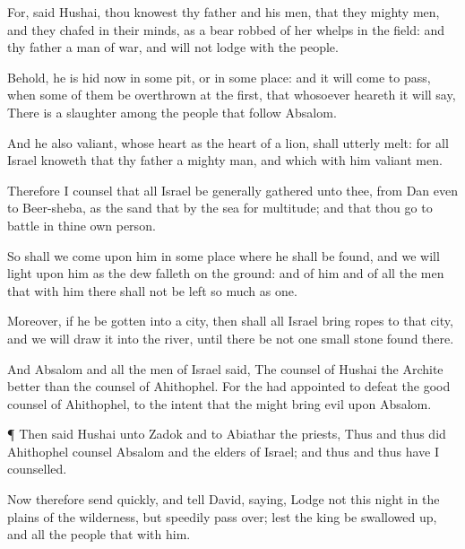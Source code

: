 {For,
said
Hushai, thou
knowest thy
father and his
men, that they
{} mighty
men, and they
{}
chafed in their
minds, as a
bear
robbed of her whelps in the
field: and thy
father
{} a
man of
war, and will not
lodge with the
people.

Behold, he is
hid now in
some
pit, or in
some
{}
place: and it will come to pass, when some of them be
overthrown at the
first, that
whosoever
heareth it will
say, There is a
slaughter among the
people that
follow
Absalom.

And he also
{}
valiant, whose
heart
{} as the
heart of a
lion, shall
utterly
melt: for all
Israel
knoweth that thy
father
{} a mighty
man, and
{} which
{} with him
{}
valiant
men.

Therefore I
counsel that all
Israel be
generally
gathered unto thee, from
Dan even to
Beer-sheba, as the
sand that
{} by the
sea for
multitude; and that thou
go to
battle in thine own
person.

So shall we
come upon him in
some
place where he shall be
found, and we will
light upon him as the
dew
falleth on the
ground: and of him and of all the
men that
{} with him there shall not be
left so much
as
one.

Moreover,
if he be
gotten into a
city, then shall all
Israel
bring
ropes to that
city, and we will
draw it into the
river, until there be not
one small
stone
found there.

And
Absalom and all the
men of
Israel
said, The
counsel of
Hushai the
Archite
{}
better than the
counsel of
Ahithophel. For the
{} had
appointed to
defeat the
good
counsel of
Ahithophel, to the
intent that the
{} might
bring
evil upon
Absalom.


\par }{\PP {}¶ Then
said
Hushai unto
Zadok and to
Abiathar the
priests, Thus and thus did
Ahithophel
counsel
Absalom and the
elders of
Israel; and thus and thus have I
counselled.

Now therefore
send
quickly, and
tell
David,
saying,
Lodge not this
night in the
plains of the
wilderness, but
speedily pass
over; lest the
king be swallowed
up, and all the
people that
{} with him.

}
